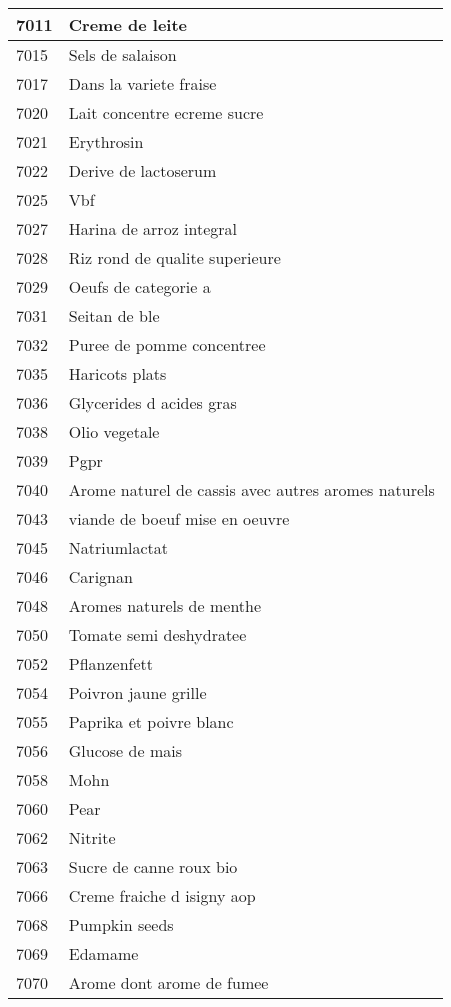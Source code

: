 \begin{longtable}{|l|l|}
7011 & Creme de leite \\ \hline 
7015 & Sels de salaison \\ \hline 
7017 & Dans la variete fraise \\ \hline 
7020 & Lait concentre ecreme sucre \\ \hline 
7021 & Erythrosin \\ \hline 
7022 & Derive de lactoserum \\ \hline 
7025 & Vbf \\ \hline 
7027 & Harina de arroz integral \\ \hline 
7028 & Riz rond de qualite superieure \\ \hline 
7029 & Oeufs de categorie a \\ \hline 
7031 & Seitan de ble \\ \hline 
7032 & Puree de pomme concentree \\ \hline 
7035 & Haricots plats \\ \hline 
7036 & Glycerides d acides gras \\ \hline 
7038 & Olio vegetale \\ \hline 
7039 & Pgpr \\ \hline 
7040 & Arome naturel de cassis avec autres aromes naturels \\ \hline 
7043 & viande de boeuf mise en oeuvre \\ \hline 
7045 & Natriumlactat \\ \hline 
7046 & Carignan \\ \hline 
7048 & Aromes naturels de menthe \\ \hline 
7050 & Tomate semi deshydratee \\ \hline 
7052 & Pflanzenfett \\ \hline 
7054 & Poivron jaune grille \\ \hline 
7055 & Paprika et poivre blanc \\ \hline 
7056 & Glucose de mais \\ \hline 
7058 & Mohn \\ \hline 
7060 & Pear \\ \hline 
7062 & Nitrite \\ \hline 
7063 & Sucre de canne roux bio \\ \hline 
7066 & Creme fraiche d isigny aop \\ \hline 
7068 & Pumpkin seeds \\ \hline 
7069 & Edamame \\ \hline 
7070 & Arome dont arome de fumee \\ \hline 

\end{longtable}
